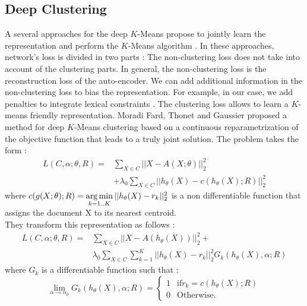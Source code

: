 \subsection{\label{seq:DeepClust}Deep Clustering}
A several approaches for the deep $K$-Means propose to jointly learn the
representation and perform the $K$-Means algorithm \cite{2018arXiv180107648A}.
In these approaches, network's loss is divided in two parts :
The non-clustering loss does not
take into account of the clustering parts. In general, the non-clustering 
loss is the reconstruction loss of the auto-encoder. We can add additional 
information in the non-clustering loss to bias the representation. For
example, in our case, we add penalties to integrate lexical constraints
.
The clustering loss allows to learn a  $K$-means friendly representation.
Moradi Fard, Thonet and Gaussier \cite{Deap-K-Means} proposed a method for deep $K$-Means 
clustering based on a continuous reparametrization of the objective function 
that leads to a truly joint solution. 
The problem takes the form : 
\begin{equation}
\begin{array}{ll}
L(C ,\alpha;\theta,R) = & \sum\limits_{X \in C} ||X - A(X;\theta)||_2^2 \\
  & + \lambda_0 \sum\limits_{X \in C}||h_\theta(X) - c(h_\theta(X); R) ||_2^2
\end{array}
\end{equation}
where $c(g(X; \theta); R) = \operatorname*{arg\,min}\limits_{k = 1 .. K} || h_\theta(X) - r_k||_2^2$
is a non differentiable function that assigns the document X
to its nearest centroid.\\
They transform this representation as follows :
\begin{equation}
\begin{array}{ll}
L(C ,\alpha;\theta,R) = & \sum\limits_{X \in C} ||X - A(h_\theta(X))||_2^2 + \\ 
& \lambda_0 \sum\limits_{X \in C}\sum\limits_{k=1}^K||h_\theta(X) - r_k ||_2^2 G_{k}(h_\theta(X), \alpha; R) 
\end{array}
\end{equation}
where $G_{k}$ is a differentiable function such that :
\begin{equation}
  \lim\limits_{\alpha \rightarrow \alpha_0}G_{k}(h_\theta(X), \alpha; R) = \left\{
\begin{array}{ll}
  1 & \mbox{if} r_k = c(h_\theta(X); R)\\
  0 & \mbox{Otherwise.}
\end{array}
\right.
\end{equation}
